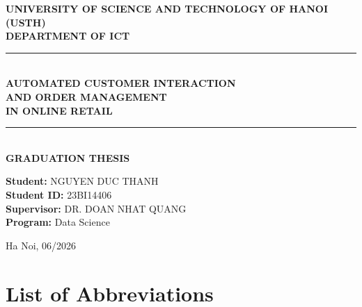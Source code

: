 \documentclass[12pt, a4paper]{report}
\begin{document}
\begin{titlepage}
\centering
\vspace*{1cm}

{\Large\bfseries UNIVERSITY OF SCIENCE AND TECHNOLOGY OF HANOI (USTH)}\\[0.3cm]
{\large\bfseries DEPARTMENT OF ICT}\\[2cm]

\rule{\linewidth}{0.5pt}\\[0.4cm]
{\LARGE\bfseries AUTOMATED CUSTOMER INTERACTION\\[0.3cm]
AND ORDER MANAGEMENT\\[0.3cm]
IN ONLINE RETAIL}\\[0.4cm]
\rule{\linewidth}{0.5pt}\\[1.5cm]

{\large\bfseries GRADUATION THESIS}\\[2cm]

\begin{flushleft}
{\large
\textbf{Student:} NGUYEN DUC THANH \\[0.3cm]
\textbf{Student ID:} 23BI14406 \\[0.3cm]
\textbf{Supervisor:} DR. DOAN NHAT QUANG \\[0.3cm]
\textbf{Program:} Data Science \\[0.3cm]
}
\end{flushleft}

\vfill
{\large Ha Noi, 06/2026}
\end{titlepage}

\tableofcontents
\listoftables
\listoffigures

\chapter*{List of Abbreviations}
\end{document}
